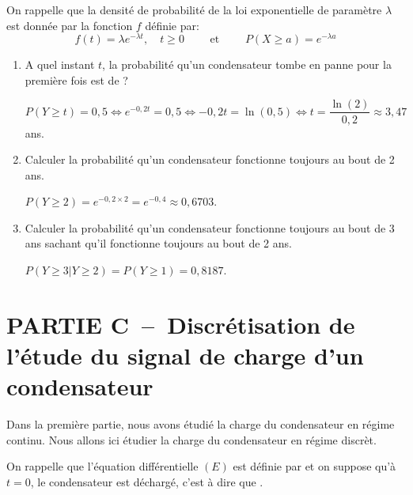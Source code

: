 On rappelle que la densité de probabilité de la loi exponentielle de paramètre $\lambda$ est donnée par la fonction $f$ définie par:
\[\boxed{f(t) = \lambda e^{-\lambda t}, \quad t \geq 0 \qquad \text{ et } \qquad P(X \geq a) = e^{-\lambda a}}\]

\begin{enumerate}[series=monDS, resume]
    \item A quel instant $t$, la probabilité qu'un condensateur tombe en panne pour la première fois est de ?
    \begin{blocvisiblex}[height=1.5]
    {\quad}
    $P(Y \geq t)=0,5 \Leftrightarrow e^{-0,2t}=0,5 \Leftrightarrow -0,2t=\ln(0,5) \Leftrightarrow t=\dfrac{\ln(2)}{0,2}\approx 3,47$ ans.
    \end{blocvisiblex}  
        \medskip
    \item Calculer la probabilité qu'un condensateur fonctionne toujours au bout de 2 ans.
    \begin{blocvisiblex}[height=1.5]
    {\quad}
    $P(Y \geq 2)=e^{-0,2 \times 2}=e^{-0,4}\approx 0,6703$.
    \end{blocvisiblex}  
        \par\medskip
    \item Calculer la probabilité qu'un condensateur fonctionne toujours au bout de 3 ans sachant qu'il fonctionne toujours au bout de 2 ans.
	\begin{blocvisiblex}[height=2]
    {\quad}
        $P(Y \geq 3|Y \geq 2)=P(Y \geq 1)=0,8187$.
\end{blocvisiblex} 

\end{enumerate}

\pagebreak

\thispagestyle{DS_LP}

\section*{PARTIE C~--~Discrétisation de l'étude du signal de charge d'un condensateur}

\bigskip

Dans la première partie, nous avons étudié la charge du condensateur en régime continu. Nous allons ici étudier la charge du condensateur en régime discrèt.


On rappelle que l'équation différentielle $(E)$ est définie par  et on suppose qu'à $t=0$, le condensateur est déchargé, c'est à dire que .

